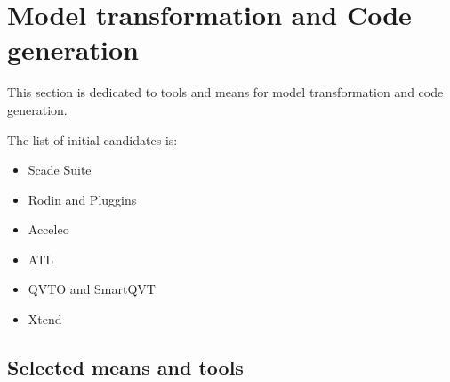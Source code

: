 

\chapter{Model transformation and Code generation}
\label{sec:transfo}

This section is dedicated to tools and means for model transformation and code generation.



The list of initial candidates is:


\begin{itemize}
\item Scade Suite
\item Rodin and Pluggins
\item Acceleo
\item ATL
\item QVTO and SmartQVT
\item Xtend
\end{itemize}

\section{Selected means and tools}

\begin{comment}
To complete after decision meeting with a section for each tool with the following contents:

\begin{itemize}
\item description of the means or tools, references and links
\item added value for openETCS
\item for which tasks and how (input/output/actions) is the mean or tools used.
\end{itemize}
\end{comment}